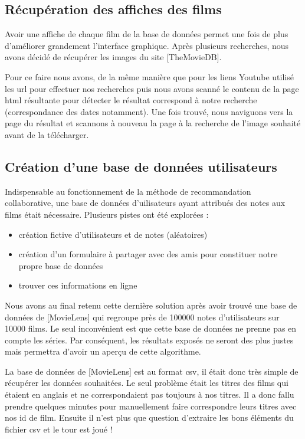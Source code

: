 \subsection{Récupération des affiches des films}
Avoir une affiche de chaque film de la base de données permet une fois de plus d'améliorer grandement l'interface graphique.
Après plusieurs recherches, nous avons décidé de récupérer les images du site \href{https://www.themoviedb.org}[TheMovieDB].\par
Pour ce faire nous avons, de la même manière que pour les liens Youtube utilisé les url pour effectuer nos recherches puis nous avons scanné le contenu de la page html résultante pour détecter le résultat correspond à notre recherche (correspondance des dates notamment). Une fois trouvé, nous naviguons vers la page du résultat et scannons à nouveau la page à la recherche de l'image souhaité avant de la télécharger.

\subsection{Création d'une base de données utilisateurs}
Indispensable au fonctionnement de la méthode de recommandation collaborative, une base de données d'uilisateurs ayant attribués des notes aux films était nécessaire. Plusieurs pistes ont été explorées :
\begin{itemize}
	\item création fictive d'utilisateurs et de notes (aléatoires)
	\item création d'un formulaire à partager avec des amis pour constituer notre propre base de données
	\item trouver ces informations en ligne
\end{itemize}
Nous avons au final retenu cette dernière solution après avoir trouvé une base de données de \href{https://grouplens.org/datasets/movielens/}[MovieLens] qui regroupe près de 100000 notes d'utilisateurs sur 10000 films. Le seul inconvénient est que cette base de données ne prenne pas en compte les séries. Par conséquent, les résultats exposés ne seront des plus justes mais permettra d'avoir un aperçu de cette algorithme.\par
La base de données de \href{https://grouplens.org/datasets/movielens/}[MovieLens] est au format csv, il était donc très simple de récupérer les données souhaitées. Le seul problème était les titres des films qui étaient en anglais et ne correspondaient pas toujours à nos titres. Il a donc fallu prendre quelques minutes pour manuellement faire correspondre leurs titres avec nos id de film. Ensuite il n'est plus que question d'extraire les bons éléments du fichier csv et le tour est joué !

